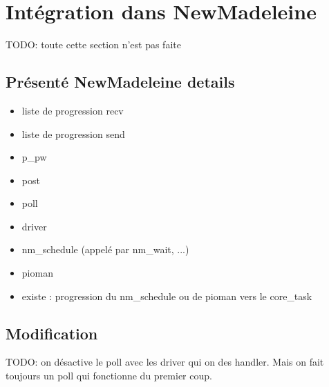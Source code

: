 \section{Intégration dans NewMadeleine}

TODO: toute cette section n'est pas faite


\subsection{Présenté NewMadeleine details}

\begin{itemize}
  \item liste de progression recv
  \item liste de progression send
  \item p_pw
  \item post
  \item poll
  \item driver
  \item nm_schedule (appelé par nm_wait, ...)
  \item pioman
  \item existe : progression du nm_schedule ou de pioman vers le core_task
\end{itemize}

\subsection{Modification}

TODO: on désactive le poll avec les driver qui on des handler. Mais on fait toujours un poll qui fonctionne du premier coup.

